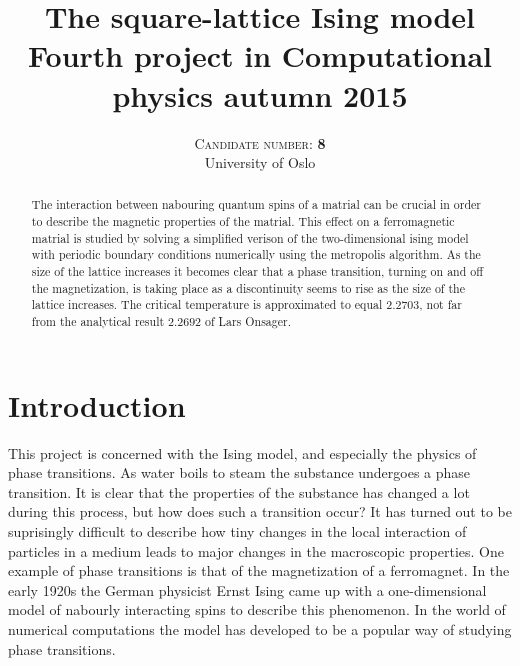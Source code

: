 \documentclass[twoside,utf8]{article}
\title{\vspace{-15mm}\fontsize{24pt}{10pt}\selectfont\textbf{
The square-lattice Ising model \\ 
\normalsize Fourth project in Computational physics autumn 2015
}} %
\author{
\large
\textsc{Candidate number: \textbf{8}} \\
\normalsize University of Oslo \\ %
\vspace{-5mm}
}
\date{}
\begin{document}
\maketitle %


\begin{abstract}

\noindent
The interaction between nabouring quantum spins of a matrial can be crucial in order to describe the magnetic properties of the matrial. This effect on a ferromagnetic matrial is studied by solving a simplified verison of the two-dimensional ising model with periodic boundary conditions numerically using the metropolis algorithm. As the size of the lattice increases it becomes clear that a phase transition, turning on and off the magnetization, is taking place as a discontinuity seems to rise as the size of the lattice increases. The critical temperature is approximated to equal $2.2703$, not far from the analytical result $2.2692$ of Lars Onsager.


\end{abstract}


\section{Introduction}
This project is concerned with the Ising model, and especially the physics of phase transitions. As water boils to steam the substance undergoes a phase transition. It is clear that the properties of the substance has changed a lot during this process, but how does such a transition occur? It has turned out to be suprisingly difficult to describe how tiny changes in the local interaction of particles in a medium leads to major changes in the macroscopic properties. One example of phase transitions is that of the magnetization of a ferromagnet. In the early 1920s the German physicist Ernst Ising came up with a one-dimensional model of nabourly interacting spins to describe this phenomenon. In the world of numerical computations the model has developed to be a popular way of studying phase transitions. 
\end{document}
